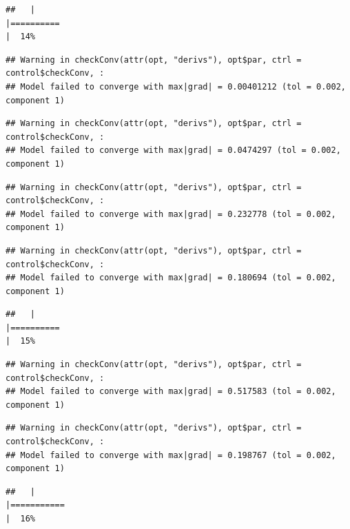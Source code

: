 \documentclass[
  12pt,
]{book}
\begin{document}
\begin{verbatim}
##   |                                                                              |==========                                                            |  14%
\end{verbatim}

\begin{verbatim}
## Warning in checkConv(attr(opt, "derivs"), opt$par, ctrl = control$checkConv, :
## Model failed to converge with max|grad| = 0.00401212 (tol = 0.002, component 1)
\end{verbatim}

\begin{verbatim}
## Warning in checkConv(attr(opt, "derivs"), opt$par, ctrl = control$checkConv, :
## Model failed to converge with max|grad| = 0.0474297 (tol = 0.002, component 1)
\end{verbatim}

\begin{verbatim}
## Warning in checkConv(attr(opt, "derivs"), opt$par, ctrl = control$checkConv, :
## Model failed to converge with max|grad| = 0.232778 (tol = 0.002, component 1)
\end{verbatim}

\begin{verbatim}
## Warning in checkConv(attr(opt, "derivs"), opt$par, ctrl = control$checkConv, :
## Model failed to converge with max|grad| = 0.180694 (tol = 0.002, component 1)
\end{verbatim}

\begin{verbatim}
##   |                                                                              |==========                                                            |  15%
\end{verbatim}

\begin{verbatim}
## Warning in checkConv(attr(opt, "derivs"), opt$par, ctrl = control$checkConv, :
## Model failed to converge with max|grad| = 0.517583 (tol = 0.002, component 1)
\end{verbatim}

\begin{verbatim}
## Warning in checkConv(attr(opt, "derivs"), opt$par, ctrl = control$checkConv, :
## Model failed to converge with max|grad| = 0.198767 (tol = 0.002, component 1)
\end{verbatim}

\begin{verbatim}
##   |                                                                              |===========                                                           |  16%
\end{verbatim}
\end{document}
